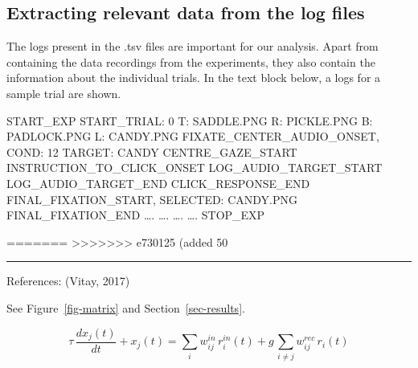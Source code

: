 \documentclass[
  a4paper,
]{article}
\newenvironment{Shaded}{}{}
\newcommand{\NormalTok}[1]{\textcolor[rgb]{0.14,0.16,0.18}{#1}}
\begin{document}
\hypertarget{extracting-relevant-data-from-the-log-files}{%
\subsection{Extracting relevant data from the log
files}\label{extracting-relevant-data-from-the-log-files}}

The logs present in the .tsv files are important for our analysis. Apart
from containing the data recordings from the experiments, they also
contain the information about the individual trials. In the text block
below, a logs for a sample trial are shown.

\begin{Shaded}
\begin{Highlighting}[]
\NormalTok{START\_EXP}
\NormalTok{START\_TRIAL: 0 T: SADDLE.PNG R: PICKLE.PNG B: PADLOCK.PNG L: CANDY.PNG}
\NormalTok{FIXATE\_CENTER\_AUDIO\_ONSET, COND: 12 TARGET: CANDY}
\NormalTok{CENTRE\_GAZE\_START}
\NormalTok{INSTRUCTION\_TO\_CLICK\_ONSET}
\NormalTok{LOG\_AUDIO\_TARGET\_START}
\NormalTok{LOG\_AUDIO\_TARGET\_END}
\NormalTok{CLICK\_RESPONSE\_END}
\NormalTok{FINAL\_FIXATION\_START, SELECTED: CANDY.PNG}
\NormalTok{FINAL\_FIXATION\_END}
\NormalTok{….}
\NormalTok{….}
\NormalTok{….}
\NormalTok{….}
\NormalTok{STOP\_EXP}
\end{Highlighting}
\end{Shaded}

=======
>>>>>>> e730125 (added 50%
\begin{center}\rule{0.5\linewidth}{0.5pt}\end{center}

References: (Vitay, 2017)

See Figure~\ref{fig-matrix} and Section~\ref{sec-results}.

\[
    \tau \, \frac{dx_j(t)}{dt} + x_j(t)= \sum_i w^{in}_{ij} \, r^{in}_i(t) + g \, \sum_{i \neq j} w^{rec}_{ij} \, r_i(t)
\]
\end{document}
